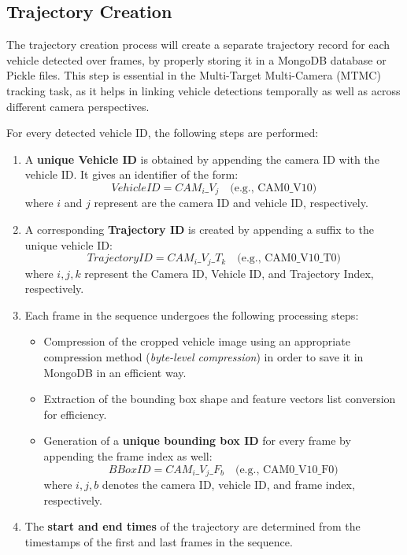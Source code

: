 \subsection{Trajectory Creation}
The trajectory creation process will create a separate trajectory record for each vehicle detected over frames, by properly storing it in a MongoDB database or Pickle files. This step is essential in the Multi-Target Multi-Camera (MTMC) tracking task, as it helps in linking vehicle detections temporally as well as across different camera perspectives.

For every detected vehicle ID, the following steps are performed:

\begin{enumerate}
    \item A \textbf{unique Vehicle ID} is obtained by appending the camera ID with the vehicle ID. It gives an identifier of the form:
    \[
        VehicleID = CAM_{i}\_V_{j}  \quad \text{(e.g., CAM0\_V10)}
    \]
    where \(i\) and \(j\) represent are the camera ID and vehicle ID, respectively.
    \item A corresponding \textbf{Trajectory ID} is created by appending a suffix to the unique vehicle ID:
    \[
        TrajectoryID = CAM_{i}\_V_{j}\_T_{k}  \quad \text{(e.g., CAM0\_V10\_T0)}
    \]
    where \(i, j, k\) represent the Camera ID, Vehicle ID, and Trajectory Index, respectively.
    
    \item Each frame in the sequence undergoes the following processing steps:
    \begin{itemize}
        \item Compression of the cropped vehicle image using an appropriate compression method (\textit{byte-level compression}) in order to save it in MongoDB in an efficient way.
        \item Extraction of the bounding box shape and feature vectors list conversion for efficiency.
        \item Generation of a \textbf{unique bounding box ID} for every frame by appending the frame index as well:
        \[
            BBoxID = CAM_{i}\_V_{j}\_F_{b} \quad \text{(e.g., CAM0\_V10\_F0)}
        \]
        where \(i, j, b\) denotes the camera ID, vehicle ID, and frame index, respectively.
    \end{itemize}

    \item The \textbf{start and end times} of the trajectory are determined from the timestamps of the first and last frames in the sequence.
\end{enumerate}

